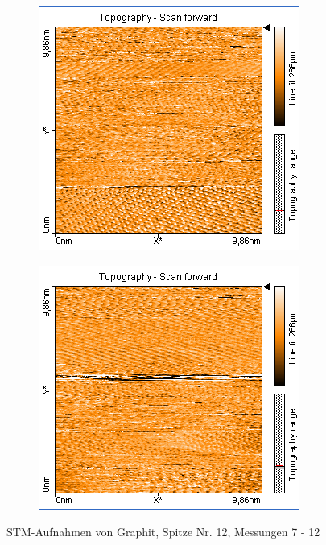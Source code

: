 \begin{figure}
\begin{subfigure}[b]{\picwidth}
        \caption{}
        \label{fig:graphit_06_10}
    \end{subfigure}
    \begin{subfigure}[b]{\picwidth}
        \includegraphics[width=\textwidth]{data/Graphit/pic_06_11_10nm}
        \caption{}
        \label{fig:graphit_06_11}
    \end{subfigure}\qquad
    \begin{subfigure}[b]{\picwidth}
        \includegraphics[width=\textwidth]{data/Graphit/pic_06_12_10nm}
        \caption{}
        \label{fig:graphit_06_12}
    \end{subfigure}
    \caption{STM-Aufnahmen von Graphit, Spitze Nr. 12, Messungen 7 - 12}\label{fig:graphit_06}
\end{figure}


